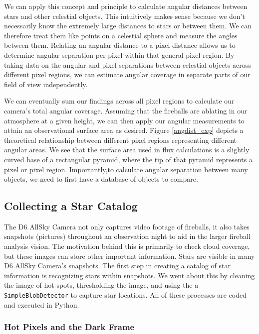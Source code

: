 We can apply this concept and principle to calculate angular distances between stars and other celestial objects.
This intuitively makes sense because we don't necessarily know the extremely large distances to stars or between them.
We can therefore treat them like points on a celestial sphere and measure the angles between them.
Relating an angular distance to a pixel distance allows us to determine angular separation per pixel within that general pixel region.
By taking data on the angular and pixel separations between celestial objects across different pixel regions, we can estimate angular coverage in separate parts of our field of view independently.

We can eventually sum our findings across all pixel regions to calculate our camera's total angular coverage.  
Assuming that the fireballs are ablating in our atmosphere at a given height, we can then apply our angular measurements to attain an observational surface area as desired.
Figure \ref{angdist_exp} depicts a theoretical relationship between different pixel regions representing different angular areas.
We see that the surface area used in flux calculations is a slightly curved base of a rectangular pyramid, where the tip of that pyramid represents a pixel or pixel region.
Importantly,to calculate angular separation between many objects, we need to first have a database of objects to compare.

\subsection{Collecting a Star Catalog}

The D6 AllSky Camera not only captures video footage of fireballs, it also takes snapshots (pictures) throughout an observation night to aid in the larger fireball analysis vision.
The motivation behind this is primarily to check cloud coverage, but these images can store other important information.
Stars are visible in many D6 AllSky Camera's snapshots.  
The first step in creating a catalog of star information is recognizing stars within snapshots.  
We went about this by cleaning the image of hot spots, thresholding the image, and using the a \texttt{SimpleBlobDetector} to capture star locations.
All of these processes are coded and executed in Python.

\subsubsection{Hot Pixels and the Dark Frame}

